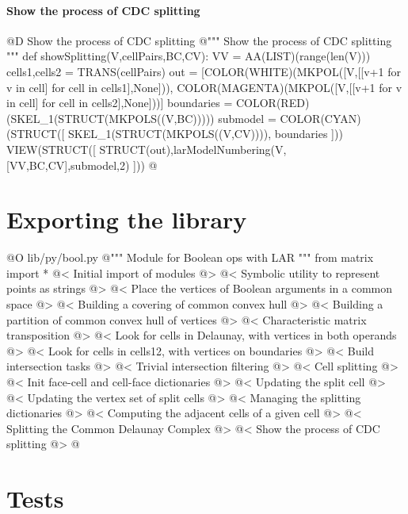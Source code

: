 \documentclass[11pt,oneside]{article}	%
\begin{document}
\paragraph{Show the process of CDC splitting}

@D Show the process of CDC splitting
@{""" Show the process of CDC splitting """
def showSplitting(V,cellPairs,BC,CV):
	VV = AA(LIST)(range(len(V)))
	cells1,cells2 = TRANS(cellPairs)
	out = [COLOR(WHITE)(MKPOL([V,[[v+1 for v in cell] for cell in cells1],None])), 
			COLOR(MAGENTA)(MKPOL([V,[[v+1 for v in cell] for cell in cells2],None]))]
	boundaries = COLOR(RED)(SKEL_1(STRUCT(MKPOLS((V,BC)))))
	submodel = COLOR(CYAN)(STRUCT([ SKEL_1(STRUCT(MKPOLS((V,CV)))), boundaries ]))
	VIEW(STRUCT([ STRUCT(out),larModelNumbering(V,[VV,BC,CV],submodel,2) ]))
@}



\section{Exporting the library}


@O lib/py/bool.py
@{""" Module for Boolean ops with LAR """
from matrix import *
@< Initial import of modules @>
@< Symbolic utility to represent points as strings @>
@< Place the vertices of Boolean arguments in a common space @>
@< Building a covering of common convex hull @>
@< Building a partition of common convex hull of vertices @>
@< Characteristic matrix transposition @>
@< Look for cells in Delaunay, with vertices in both operands @>
@< Look for cells in cells12, with vertices on boundaries @>
@< Build intersection tasks @>
@< Trivial intersection filtering @>
@< Cell splitting @>
@< Init face-cell and cell-face dictionaries @>
@< Updating the split cell @>
@< Updating the vertex set  of split cells @>
@< Managing the splitting dictionaries @>
@< Computing the adjacent cells of a given cell @>
@< Splitting the Common Delaunay Complex @>
@< Show the process of CDC splitting @>
@}

\section{Tests}
\end{document}
